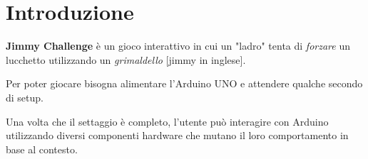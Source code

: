 \chapter{Introduzione}
\textbf{Jimmy Challenge} è un gioco interattivo in cui un "ladro" tenta di \textit{forzare} un lucchetto utilizzando un \textit{grimaldello} [jimmy in inglese]. 

Per poter giocare bisogna alimentare l'Arduino UNO e attendere qualche secondo di setup.

Una volta che il settaggio è completo, l'utente può interagire con Arduino utilizzando diversi componenti hardware che mutano il loro comportamento in base al contesto.




